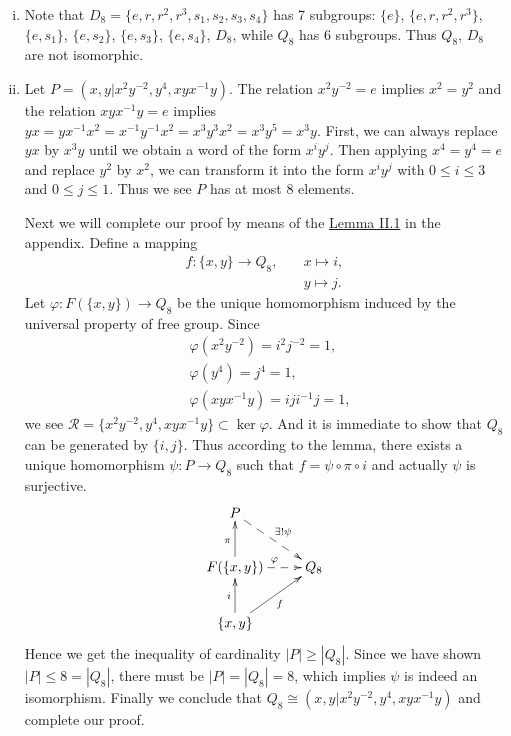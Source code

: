 \documentclass[12pt,letterpaper,boxed]{hmcpset}
\begin{document}
\begin{solution}
\begin{enumerate}[(i)]
		\item Note that $D_8=\{e,r,r^2,r^3,s_1,s_2,s_3,s_4\}$ has 7 subgroups: $\{e\}$, $\{e,r,r^2,r^3\}$, $\{e,s_1\}$, $\{e,s_2\}$, $\{e,s_3\}$, $\{e,s_4\}$, $D_8$, while $Q_8$ has 6 subgroups. Thus $Q_8$, $D_8$ are not isomorphic.
		\item 	Let $P=\left(x, y | x^{2} y^{-2}, y^{4}, x y x^{-1} y\right)$. The relation $x^{2} y^{-2}=e$ implies $x^2=y^2$ and the relation $xyx^{-1}y=e$ implies $yx=yx^{-1}x^2=x^{-1}y^{-1}x^2=x^3y^3x^2=x^3y^5=x^3y$. First, we can always replace $yx$ by $x^3y$ until we obtain a word of the form $x^iy^j$. Then applying $x^4=y^4=e$ and replace $y^2$ by $x^2$, we can transform it into the form $x^iy^j$ with $0\le i\le 3$ and $0\le j \le 1$. Thus we see $P$ has at most 8 elements. 
		
		Next we will complete our proof by means of the \hyperlink{Lemma II.1}{Lemma II.1} in the appendix. Define a mapping
		\begin{align*}
		f:\{x,y\}\longrightarrow Q_8,\quad& x\longmapsto i,\\
		& y\longmapsto j.
		\end{align*}
		Let $\varphi:F(\{x,y\})\to Q_8$ be the unique homomorphism induced by the universal property of free group. Since
		\begin{align*}
		&\varphi(x^{2} y^{-2})=i^2j^{-2}=1,\\
		&\varphi(y^{4})=j^{4}=1,\\
		&\varphi(x y x^{-1} y)=i j i^{-1} j=1,
		\end{align*}
		we see $\mathscr{R}=\{x^{2} y^{-2}, y^{4}, x y x^{-1} y\}\subset\ker\varphi$. And it is immediate to show that $Q_8$ can be generated by $\{i,j\}$. Thus according to the lemma, there exists a unique homomorphism $\psi:P\to Q_8$ such that $f=\psi\circ\pi\circ i$ and actually $\psi$ is surjective. 
		\[\xymatrix{
			P\ar@{-->}[rd]^{\exists!\psi}\\
			F(\{x,y\})\ar@{-->}[r]^{\varphi}\ar[u]^{\pi} &Q_8\\
			\{x,y\}\ar[ru]_{f}\ar[u]^{i}&    
		}\]
		Hence we get the inequality of cardinality $|P|\ge|Q_8|$. Since we have shown $|P|\le 8=|Q_8|$, there must be $|P|=|Q_8|=8$, which implies $\psi$ is indeed an isomorphism. Finally we conclude that $Q_8\cong\left(x, y | x^{2} y^{-2}, y^{4}, x y x^{-1} y\right)$ and complete our proof. 
	
	\end{enumerate}
\end{solution}
\end{document}
